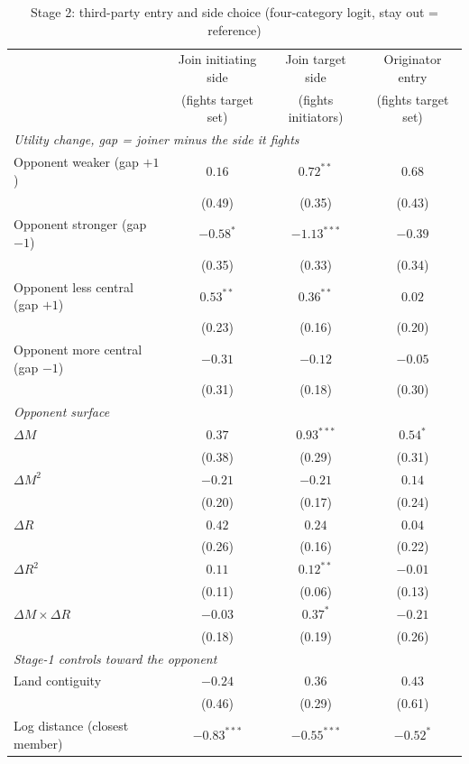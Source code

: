 \begin{table}[!htbp]\centering\small
\caption{Stage 2: third-party entry and side choice (four-category logit, stay out = reference)}\label{tab:stage2}
\begin{tabular}{lccc}
\toprule
 & Join initiating side & Join target side & Originator entry \\
 & (fights target set) & (fights initiators) & (fights target set) \\
\midrule
\multicolumn{4}{l}{\emph{Utility change, gap = joiner minus the side it fights}} \\
Opponent weaker (gap $+1$) & $0.16$ & $0.72^{**}$ & $0.68$ \\
 & (0.49) & (0.35) & (0.43) \\
Opponent stronger (gap $-1$) & $-0.58^{*}$ & $-1.13^{***}$ & $-0.39$ \\
 & (0.35) & (0.33) & (0.34) \\
Opponent less central (gap $+1$) & $0.53^{**}$ & $0.36^{**}$ & $0.02$ \\
 & (0.23) & (0.16) & (0.20) \\
Opponent more central (gap $-1$) & $-0.31$ & $-0.12$ & $-0.05$ \\
 & (0.31) & (0.18) & (0.30) \\
\midrule
\multicolumn{4}{l}{\emph{Opponent surface}} \\
$\Delta M$ & $0.37$ & $0.93^{***}$ & $0.54^{*}$ \\
 & (0.38) & (0.29) & (0.31) \\
$\Delta M^2$ & $-0.21$ & $-0.21$ & $0.14$ \\
 & (0.20) & (0.17) & (0.24) \\
$\Delta R$ & $0.42$ & $0.24$ & $0.04$ \\
 & (0.26) & (0.16) & (0.22) \\
$\Delta R^2$ & $0.11$ & $0.12^{**}$ & $-0.01$ \\
 & (0.11) & (0.06) & (0.13) \\
$\Delta M \times \Delta R$ & $-0.03$ & $0.37^{*}$ & $-0.21$ \\
 & (0.18) & (0.19) & (0.26) \\
\midrule
\multicolumn{4}{l}{\emph{Stage-1 controls toward the opponent}} \\
Land contiguity & $-0.24$ & $0.36$ & $0.43$ \\
 & (0.46) & (0.29) & (0.61) \\
Log distance (closest member) & $-0.83^{***}$ & $-0.55^{***}$ & $-0.52^{*}$ \\

\end{tabular}
\end{table}
